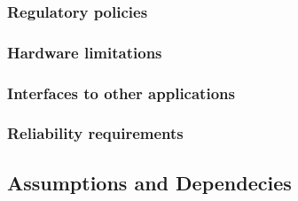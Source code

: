 \subsubsection{Regulatory policies}

\subsubsection{Hardware limitations}

\subsubsection{Interfaces to other applications}


\subsubsection{Reliability requirements}

\subsection{Assumptions and Dependecies}



